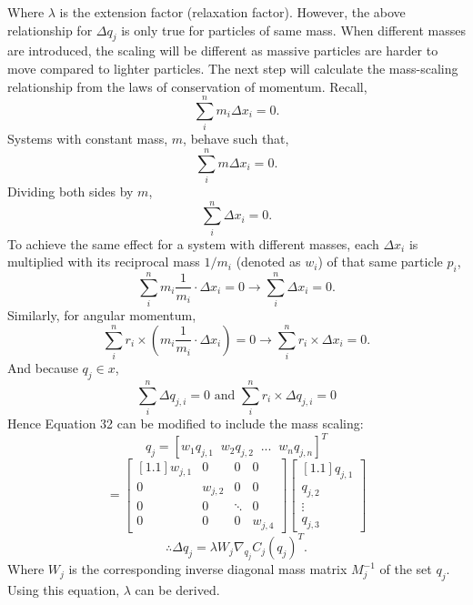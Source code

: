 \documentclass[12pt, letterpaper]{article}
\begin{document}
Where $\lambda$ is the extension factor (relaxation factor). However, the above relationship for $\Delta q_j$ is only true for particles of same mass. When different masses are introduced, the scaling will be different as massive particles are harder to move compared to lighter particles. The next step will calculate the mass-scaling relationship from the laws of conservation of momentum. Recall, 
$$\sum\limits_{i}^{n} m_{i} \Delta x_{i} = 0.$$
Systems with constant mass, $m$, behave such that,
$$\sum\limits_{i}^{n} m \Delta x_{i} = 0.$$
Dividing both sides by $m$,
$$\sum\limits_{i}^{n} \Delta x_{i} = 0.$$
To achieve the same effect for a system with different masses, each $\Delta x_{i}$ is multiplied with its reciprocal mass $1/m_{i}$ (denoted as $w_{i}$) of that same particle $p_i$,
\begin{equation}
    \sum\limits_{i}^{n} m_{i}\frac{1}{m_{i}} \cdot \Delta x_{i} = 0 \rightarrow \sum\limits_{i}^{n} \Delta x_{i} = 0.
\end{equation}
Similarly, for angular momentum,
\begin{equation}
   \sum\limits_{i}^{n} r_{i} \times (m_{i}\frac{1}{m_{i}} \cdot \Delta x_{i}) = 0 \rightarrow \sum\limits_{i}^{n} r_{i} \times \Delta x_{i} = 0. 
\end{equation}
And because $q_j \in x$, 
$$
   \sum\limits_{i}^{n} \Delta q_{j,i} = 0 \text{ and } \sum\limits_{i}^{n} r_{i} \times \Delta q_{j,i} = 0
$$
Hence Equation 32 can be modified to include the mass scaling: 
$$q_{j} = [w_1 q_{j,1}\;\; w_2 q_{j,2}\;\;...\;\;w_n q_{j,n}]^T$$
$$= \begin{bmatrix}[1.1] w_{j,1} &0&0&0 \\ 0&w_{j,2} &0&0 \\ 0&0& \ddots&0 \\0&0&0&w_{j,4} \end{bmatrix}  \begin{bmatrix}[1.1]q_{j,1}\\q_{j,2}\\\vdots\\q_{j,3}\end{bmatrix}$$
\begin{equation}
    \therefore \Delta q_j =  \lambda W_j \nabla_{q_j}C_j(q_j)^{T}.
\end{equation}
Where $W_j$ is the corresponding inverse diagonal mass matrix $M_j^{-1}$ of the set $q_j$. Using this equation, $\lambda$ can be derived.
\end{document}

